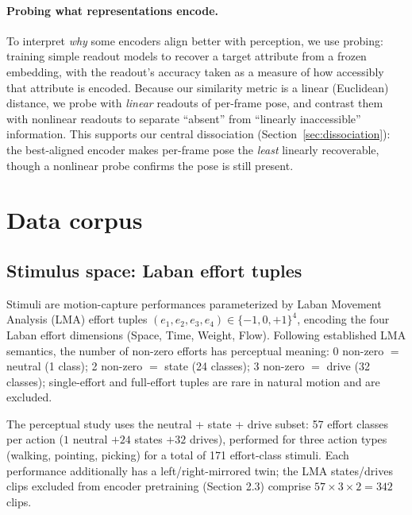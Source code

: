 \documentclass[letterpaper]{article} %
\begin{document}
\paragraph{Probing what representations encode.}
To interpret \emph{why} some encoders align better with perception, we use probing: training simple
readout models to recover a target attribute from a frozen embedding, with the readout's accuracy
taken as a measure of how accessibly that attribute is encoded. Because our similarity metric is a
linear (Euclidean) distance, we probe with \emph{linear} readouts of per-frame pose, and contrast
them with nonlinear readouts to separate ``absent'' from ``linearly inaccessible'' information. This
supports our central dissociation (Section~\ref{sec:dissociation}): the best-aligned encoder makes
per-frame pose the \emph{least} linearly recoverable, though a nonlinear probe confirms the pose is
still present.

\section{Data corpus}
\label{sec:data}

\subsection{Stimulus space: Laban effort tuples}
\label{sec:stimulus}
Stimuli are motion-capture performances parameterized by Laban Movement Analysis (LMA)
{effort tuples} $(e_1, e_2, e_3, e_4) \in \{-1, 0, +1\}^4$, encoding the four Laban
effort dimensions (Space, Time, Weight, Flow). Following established LMA semantics, the number
of non-zero efforts has perceptual meaning: 0 non-zero $=$ neutral (1 class); 2 non-zero $=$
{state} (24 classes); 3 non-zero $=$ {drive} (32 classes); single-effort and
full-effort tuples are rare in natural motion and are excluded.

The perceptual study uses the {neutral + state + drive} subset: {57 effort classes
per action} ($1$ neutral $+ 24$ states $+ 32$ drives), performed for three action
types ({walking, pointing, picking}) for a total of 171 effort-class stimuli. Each
performance additionally has a left/right-mirrored twin; the LMA states/drives clips excluded
from encoder pretraining (Section 2.3) comprise $57 \times 3 \times 2 = 342$ clips.
\end{document}
